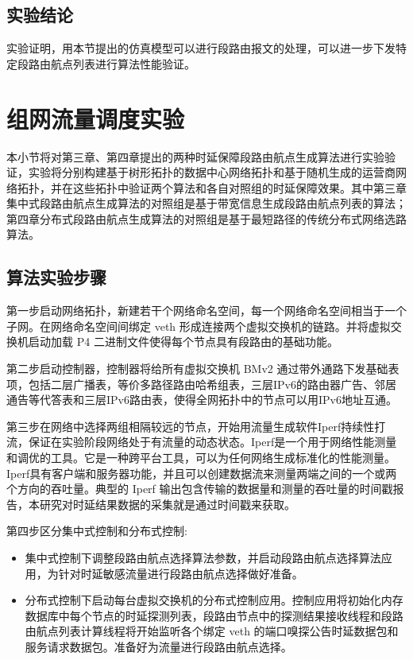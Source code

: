 \subsection{实验结论}

实验证明，用本节提出的仿真模型可以进行段路由报文的处理，可以进一步下发特定段路由航点列表进行算法性能验证。

\section{组网流量调度实验}

本小节将对第三章、第四章提出的两种时延保障段路由航点生成算法进行实验验证，实验将分别构建基于树形拓扑的数据中心网络拓扑和基于随机生成的运营商网络拓扑，并在这些拓扑中验证两个算法和各自对照组的时延保障效果。其中第三章集中式段路由航点生成算法的对照组是基于带宽信息生成段路由航点列表的算法；第四章分布式段路由航点生成算法的对照组是基于最短路径的传统分布式网络选路算法。

\subsection{算法实验步骤}

第一步启动网络拓扑，新建若干个网络命名空间，每一个网络命名空间相当于一个子网。在网络命名空间间绑定 \gls*{veth} 形成连接两个虚拟交换机的链路。并将虚拟交换机启动加载 \gls*{P4} 二进制文件使得每个节点具有段路由的基础功能。

第二步启动控制器，控制器将给所有虚拟交换机 \gls*{BMv2} 通过带外通路下发基础表项，包括二层广播表，等价多路径路由哈希组表，三层IPv6的路由器广告、邻居通告等代答表和三层IPv6路由表，使得全网拓扑中的节点可以用IPv6地址互通。

第三步在网络中选择两组相隔较远的节点，开始用流量生成软件Iperf持续性打流，保证在实验阶段网络处于有流量的动态状态。Iperf是一个用于网络性能测量和调优的工具。它是一种跨平台工具，可以为任何网络生成标准化的性能测量。Iperf具有客户端和服务器功能，并且可以创建数据流来测量两端之间的一个或两个方向的吞吐量。典型的 Iperf 输出包含传输的数据量和测量的吞吐量的时间戳报告，本研究对时延结果数据的采集就是通过时间戳来获取。

第四步区分集中式控制和分布式控制:

\begin{itemize}
\item 集中式控制下调整段路由航点选择算法参数，并启动段路由航点选择算法应用，为针对时延敏感流量进行段路由航点选择做好准备。
\item 分布式控制下启动每台虚拟交换机的分布式控制应用。控制应用将初始化内存数据库中每个节点的时延探测列表，段路由节点中的探测结果接收线程和段路由航点列表计算线程将开始监听各个绑定 \gls*{veth} 的端口嗅探公告时延数据包和服务请求数据包。准备好为流量进行段路由航点选择。
\end{itemize}

